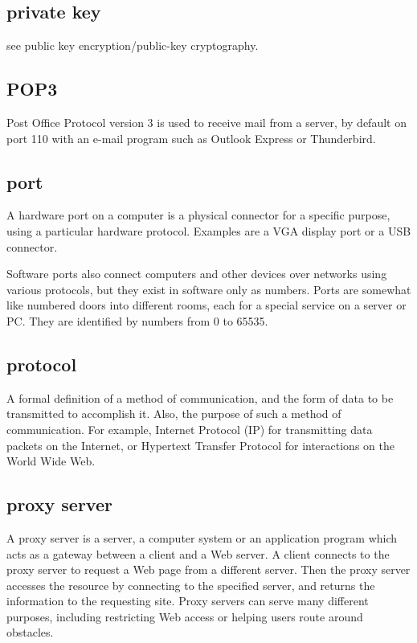 \subsection{private key}

see public key encryption/public-key cryptography.

\subsection{POP3}

Post Office Protocol version 3 is used to receive mail from a server, by
default on port 110 with an e-mail program such as Outlook Express or
Thunderbird.

\subsection{port}

A hardware port on a computer is a physical connector for a specific
purpose, using a particular hardware protocol. Examples are a VGA
display port or a USB connector.

Software ports also connect computers and other devices over networks
using various protocols, but they exist in software only as numbers.
Ports are somewhat like numbered doors into different rooms, each for a
special service on a server or PC. They are identified by numbers from 0
to 65535.

\subsection{protocol}

A formal definition of a method of communication, and the form of data
to be transmitted to accomplish it. Also, the purpose of such a method
of communication. For example, Internet Protocol (IP) for transmitting
data packets on the Internet, or Hypertext Transfer Protocol for
interactions on the World Wide Web.

\subsection{proxy server}

A proxy server is a server, a computer system or an application program
which acts as a gateway between a client and a Web server. A client
connects to the proxy server to request a Web page from a different
server. Then the proxy server accesses the resource by connecting to the
specified server, and returns the information to the requesting site.
Proxy servers can serve many different purposes, including restricting
Web access or helping users route around obstacles.

